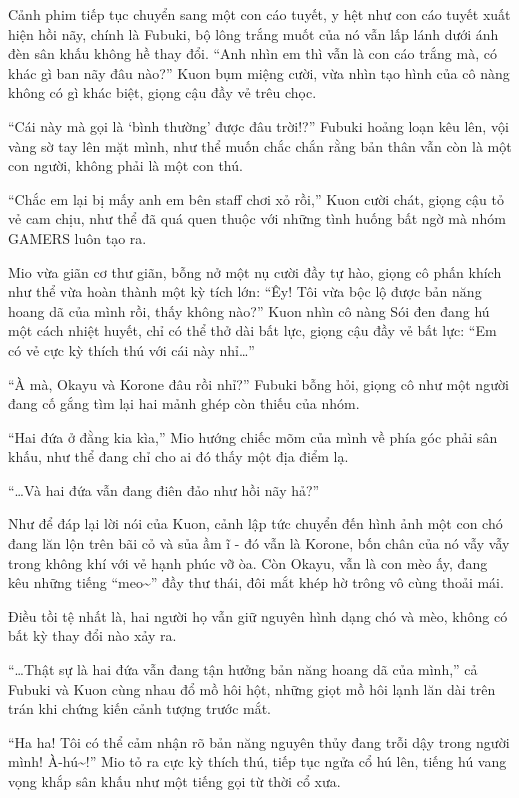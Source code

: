 \documentclass[../main.tex]{subfiles}
\begin{document}
Cảnh phim tiếp tục chuyển sang một con cáo tuyết, y hệt như con cáo tuyết xuất hiện hồi nãy, chính là Fubuki, bộ lông trắng muốt của nó vẫn lấp lánh dưới ánh đèn sân khấu không hề thay đổi. ``Anh nhìn em thì vẫn là con cáo trắng mà, có khác gì ban nãy đâu nào?'' Kuon bụm miệng cười, vừa nhìn tạo hình của cô nàng không có gì khác biệt, giọng cậu đầy vẻ trêu chọc.

``Cái này mà gọi là `bình thường' được đâu trời!?'' Fubuki hoảng loạn kêu lên, vội vàng sờ tay lên mặt mình, như thể muốn chắc chắn rằng bản thân vẫn còn là một con người, không phải là một con thú.

``Chắc em lại bị mấy anh em bên staff chơi xỏ rồi,'' Kuon cười chát, giọng cậu tỏ vẻ cam chịu, như thể đã quá quen thuộc với những tình huống bất ngờ mà nhóm GAMERS luôn tạo ra.

Mio vừa giãn cơ thư giãn, bỗng nở một nụ cười đầy tự hào, giọng cô phấn khích như thể vừa hoàn thành một kỳ tích lớn: ``Êy! Tôi vừa bộc lộ được bản năng hoang dã của mình rồi, thấy không nào?'' Kuon nhìn cô nàng Sói đen đang hú một cách nhiệt huyết, chỉ có thể thở dài bất lực, giọng cậu đầy vẻ bất lực: ``Em có vẻ cực kỳ thích thú với cái này nhỉ\dots''

``À mà, Okayu và Korone đâu rồi nhỉ?'' Fubuki bỗng hỏi, giọng cô như một người đang cố gắng tìm lại hai mảnh ghép còn thiếu của nhóm.

``Hai đứa ở đằng kia kìa,'' Mio hướng chiếc mõm của mình về phía góc phải sân khấu, như thể đang chỉ cho ai đó thấy một địa điểm lạ.

``\dots Và hai đứa vẫn đang điên đảo như hồi nãy hả?''

Như để đáp lại lời nói của Kuon, cảnh lập tức chuyển đến hình ảnh một con chó đang lăn lộn trên bãi cỏ và sủa ầm ĩ - đó vẫn là Korone, bốn chân của nó vẫy vẫy trong không khí với vẻ hạnh phúc vỡ òa. Còn Okayu, vẫn là con mèo ấy, đang kêu những tiếng ``meo\~{}'' đầy thư thái, đôi mắt khép hờ trông vô cùng thoải mái.

Điều tồi tệ nhất là, hai người họ vẫn giữ nguyên hình dạng chó và mèo, không có bất kỳ thay đổi nào xảy ra.

``\dots Thật sự là hai đứa vẫn đang tận hưởng bản năng hoang dã của mình,'' cả Fubuki và Kuon cùng nhau đổ mồ hôi hột, những giọt mồ hôi lạnh lăn dài trên trán khi chứng kiến cảnh tượng trước mắt.

``Ha ha! Tôi có thể cảm nhận rõ bản năng nguyên thủy đang trỗi dậy trong người mình! À-hú\~{}!'' Mio tỏ ra cực kỳ thích thú, tiếp tục ngửa cổ hú lên, tiếng hú vang vọng khắp sân khấu như một tiếng gọi từ thời cổ xưa.
\end{document}
